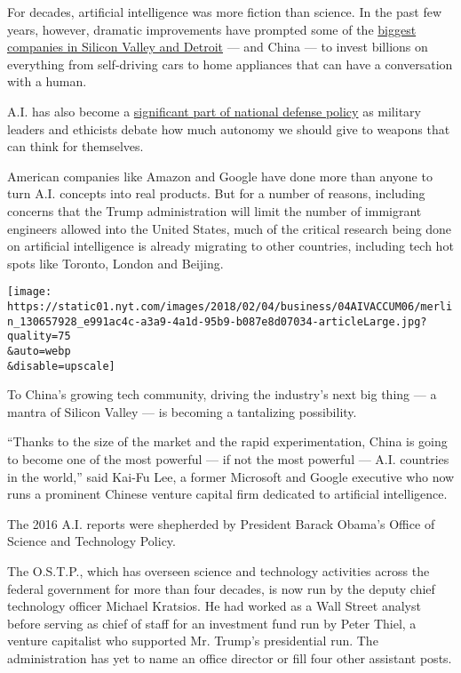 For decades, artificial intelligence was more fiction than science. In
the past few years, however, dramatic improvements have prompted some of
the
\href{https://www.nytimes.com/2018/01/04/technology/self-driving-cars-aurora.html}{biggest
companies in Silicon Valley and Detroit} --- and China --- to invest
billions on everything from self-driving cars to home appliances that
can have a conversation with a human.

A.I. has also become a
\href{https://www.nytimes.com/2016/10/26/us/pentagon-artificial-intelligence-terminator.html}{significant
part of national defense policy} as military leaders and ethicists
debate how much autonomy we should give to weapons that can think for
themselves.

American companies like Amazon and Google have done more than anyone to
turn A.I. concepts into real products. But for a number of reasons,
including concerns that the Trump administration will limit the number
of immigrant engineers allowed into the United States, much of the
critical research being done on artificial intelligence is already
migrating to other countries, including tech hot spots like Toronto,
London and Beijing.

\texttt{[image: https://static01.nyt.com/images/2018/02/04/business/04AIVACCUM06/merlin\_130657928\_e991ac4c-a3a9-4a1d-95b9-b087e8d07034-articleLarge.jpg?quality=75\\\&auto=webp\\\&disable=upscale]}

To China's growing tech community, driving the industry's next big thing
--- a mantra of Silicon Valley --- is becoming a tantalizing
possibility.

``Thanks to the size of the market and the rapid experimentation, China
is going to become one of the most powerful --- if not the most powerful
--- A.I. countries in the world,'' said Kai-Fu Lee, a former Microsoft
and Google executive who now runs a prominent Chinese venture capital
firm dedicated to artificial intelligence.

The 2016 A.I. reports were shepherded by President Barack Obama's Office
of Science and Technology Policy.

The O.S.T.P., which has overseen science and technology activities
across the federal government for more than four decades, is now run by
the deputy chief technology officer Michael Kratsios. He had worked as a
Wall Street analyst before serving as chief of staff for an investment
fund run by Peter Thiel, a venture capitalist who supported Mr. Trump's
presidential run. The administration has yet to name an office director
or fill four other assistant posts.

